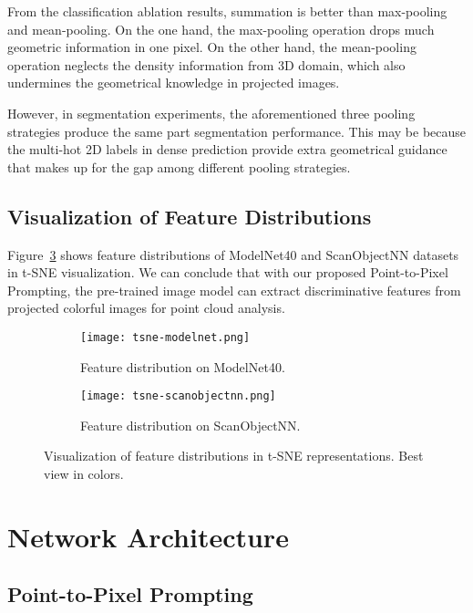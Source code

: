 \documentclass{article}
\begin{document}
From the classification ablation results, summation is better than max-pooling and mean-pooling. On the one hand, the max-pooling operation drops much geometric information in one pixel. On the other hand, the mean-pooling operation neglects the density information from 3D domain, which also undermines the geometrical knowledge in projected images.

However, in segmentation experiments, the aforementioned three pooling strategies produce the same part segmentation performance. This may be because the multi-hot 2D labels in dense prediction provide extra geometrical guidance that makes up for the gap among different pooling strategies. 



\subsection{Visualization of Feature Distributions}

Figure~\ref{fig:tsne} shows feature distributions of ModelNet40 and ScanObjectNN datasets in t-SNE visualization. We can conclude that with our proposed Point-to-Pixel Prompting, the pre-trained image model can extract discriminative features from projected colorful images for point cloud analysis.

\begin{figure}[t]
     \centering
     \begin{subfigure}[b]{0.49\textwidth}
         \centering
         \texttt{[image: tsne-modelnet.png]}
         \caption{Feature distribution on ModelNet40.}
         \label{fig:tsne_modelnet}
     \end{subfigure}
     \hfill
     \begin{subfigure}[b]{0.49\textwidth}
         \centering
         \texttt{[image: tsne-scanobjectnn.png]}
         \caption{Feature distribution on ScanObjectNN.}
         \label{fig:tsne_scanobjectnn}
     \end{subfigure}
     \caption{Visualization of feature distributions in t-SNE representations. Best view in colors.}
     \label{fig:tsne}
\end{figure}

\section{Network Architecture}

\subsection{Point-to-Pixel Prompting}
\end{document}
